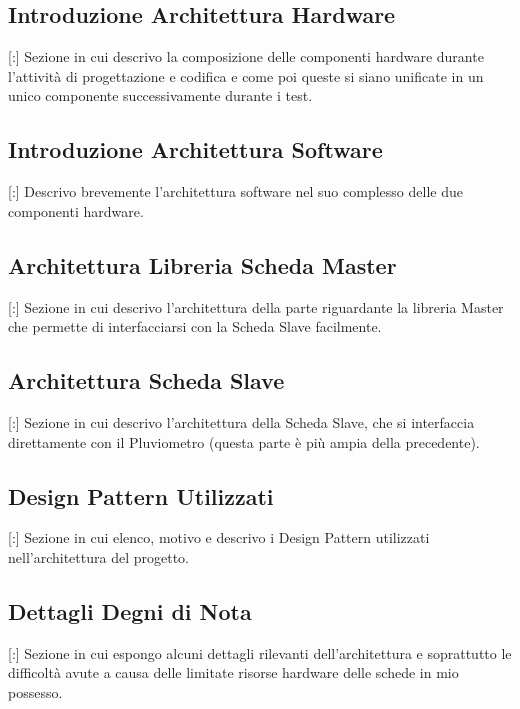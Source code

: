 \subsection{Introduzione Architettura Hardware}

[:] Sezione in cui descrivo la composizione delle componenti hardware durante l'attività di progettazione e codifica e come poi queste si siano unificate in un unico componente successivamente durante i test.

\subsection{Introduzione Architettura Software}

[:] Descrivo brevemente l'architettura software nel suo complesso delle due componenti hardware.

\subsection{Architettura Libreria Scheda Master}

[:] Sezione in cui descrivo l'architettura della parte riguardante la libreria Master che permette di interfacciarsi con la Scheda Slave facilmente. 


\subsection{Architettura Scheda Slave}

[:] Sezione in cui descrivo l'architettura della Scheda Slave, che si interfaccia direttamente con il Pluviometro (questa parte è più ampia della precedente).

\subsection{Design Pattern Utilizzati}

[:] Sezione in cui elenco, motivo e descrivo i Design Pattern utilizzati nell'architettura del progetto.

\subsection{Dettagli Degni di Nota}

[:] Sezione in cui espongo alcuni dettagli rilevanti dell'architettura e soprattutto le difficoltà avute a causa delle limitate risorse hardware delle schede in mio possesso.

